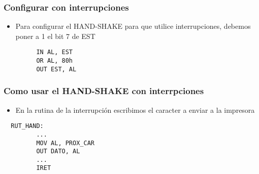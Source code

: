 \documentclass{beamer}
\begin{document}
\begin{frame}[fragile]
\frametitle{Configurar con interrupciones}
\begin{itemize}
 \item Para configurar el HAND-SHAKE para que utilice interrupciones, debemos poner a 1 el bit 7 de EST
\end{itemize}
\begin{block}{}
 \begin{verbatim}
         IN AL, EST 
         OR AL, 80h
         OUT EST, AL
 \end{verbatim}
\end{block}
\end{frame}

\begin{frame}[fragile]
\frametitle{Como usar el HAND-SHAKE con interrpciones}
\begin{itemize}
 \item En la rutina de la interrupción escribimos el caracter a enviar a la impresora
\end{itemize}
\begin{block}{}
 \begin{verbatim}
  RUT_HAND:
         ...
         MOV AL, PROX_CAR
         OUT DATO, AL
         ...
         IRET
 \end{verbatim}
\end{block}
\end{frame}
\end{document}
